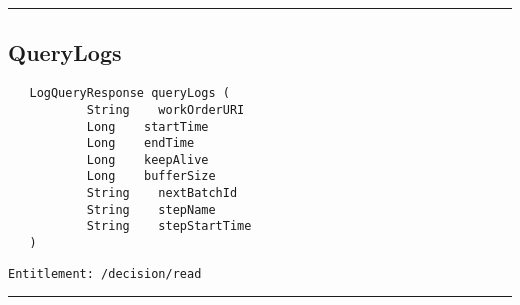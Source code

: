 \rule{12cm}{2pt}
\subsection{QueryLogs}
\label{Api:QueryLogs}
\begin{Verbatim}
   LogQueryResponse queryLogs (
           String    workOrderURI
           Long    startTime
           Long    endTime
           Long    keepAlive
           Long    bufferSize
           String    nextBatchId
           String    stepName
           String    stepStartTime
   )
\end{Verbatim}
\begin{Verbatim}[formatcom=\color{Maroon}]
  Entitlement: /decision/read
\end{Verbatim}



\rule{12cm}{2pt}
